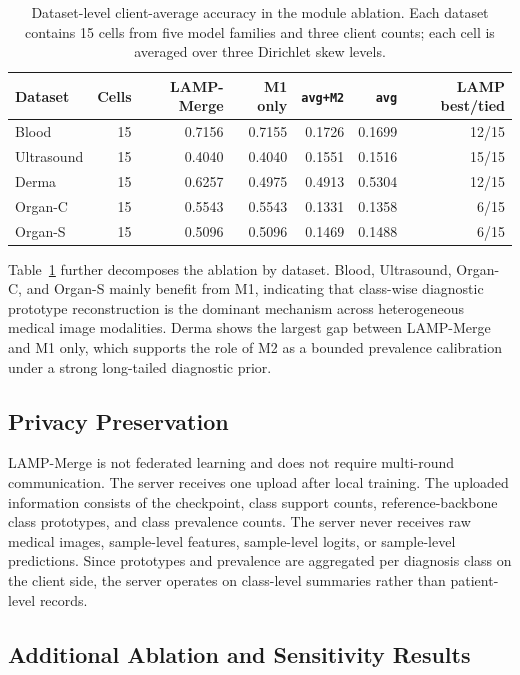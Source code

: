 \begin{table}[t]
\centering
\caption{Dataset-level client-average accuracy in the module ablation. Each dataset contains 15 cells from five model families and three client counts; each cell is averaged over three Dirichlet skew levels.}
\label{tab:dataset-ablation-acc}
\scriptsize
\setlength{\tabcolsep}{3.0pt}
\begin{tabular}{lrrrrrr}
\toprule
Dataset & Cells & LAMP-Merge & M1 only & \texttt{avg+M2} & \texttt{avg} & LAMP best/tied \\
\midrule
Blood & 15 & 0.7156 & 0.7155 & 0.1726 & 0.1699 & 12/15 \\
Ultrasound & 15 & 0.4040 & 0.4040 & 0.1551 & 0.1516 & 15/15 \\
Derma & 15 & 0.6257 & 0.4975 & 0.4913 & 0.5304 & 12/15 \\
Organ-C & 15 & 0.5543 & 0.5543 & 0.1331 & 0.1358 & 6/15 \\
Organ-S & 15 & 0.5096 & 0.5096 & 0.1469 & 0.1488 & 6/15 \\
\bottomrule
\end{tabular}
\end{table}

Table~\ref{tab:dataset-ablation-acc} further decomposes the ablation by dataset. Blood, Ultrasound, Organ-C, and Organ-S mainly benefit from M1, indicating that class-wise diagnostic prototype reconstruction is the dominant mechanism across heterogeneous medical image modalities. Derma shows the largest gap between LAMP-Merge and M1 only, which supports the role of M2 as a bounded prevalence calibration under a strong long-tailed diagnostic prior.

\subsection{Privacy Preservation}

LAMP-Merge is not federated learning and does not require multi-round communication. The server receives one upload after local training. The uploaded information consists of the checkpoint, class support counts, reference-backbone class prototypes, and class prevalence counts. The server never receives raw medical images, sample-level features, sample-level logits, or sample-level predictions. Since prototypes and prevalence are aggregated per diagnosis class on the client side, the server operates on class-level summaries rather than patient-level records.

\subsection{Additional Ablation and Sensitivity Results}

